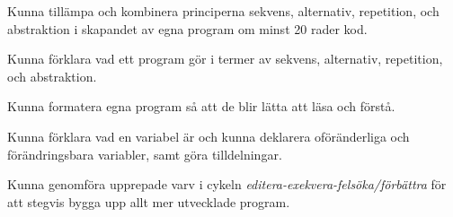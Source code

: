 
\item Kunna tillämpa och kombinera principerna sekvens, alternativ, repetition, och abstraktion i skapandet av egna program om minst 20 rader kod.
\item Kunna förklara vad ett program gör i termer av sekvens, alternativ, repetition, och abstraktion.
\item Kunna formatera egna program så att de blir lätta att läsa och förstå.
\item Kunna förklara vad en variabel är och kunna deklarera oföränderliga och förändringsbara variabler, samt göra tilldelningar.
\item Kunna genomföra upprepade varv i cykeln \emph{editera-exekvera-felsöka/förbättra} för att stegvis bygga upp allt mer utvecklade program.
